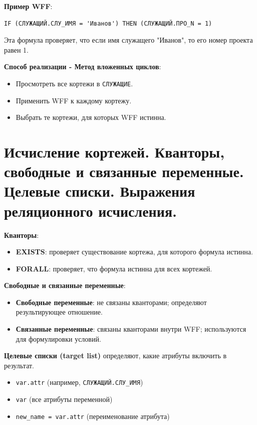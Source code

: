 \documentclass[a4paper,12pt]{article}
\begin{document}
\textbf{Пример WFF}:

\begin{verbatim}
IF (СЛУЖАЩИЙ.СЛУ_ИМЯ = 'Иванов') THEN (СЛУЖАЩИЙ.ПРО_N = 1)
\end{verbatim}

Эта формула проверяет, что если имя служащего "Иванов", то его номер проекта равен 1.

\textbf{Способ реализации - Метод вложенных циклов}:

\begin{itemize}
    \item Просмотреть все кортежи в \texttt{СЛУЖАЩИЕ}.
    \item Применить WFF к каждому кортежу.
    \item Выбрать те кортежи, для которых WFF истинна.
\end{itemize}

\section{Исчисление кортежей. Кванторы, свободные и связанные переменные. Целевые списки. Выражения реляционного исчисления.}

\textbf{Кванторы}:

\begin{itemize}
    \item \textbf{EXISTS}: проверяет существование кортежа, для которого формула истинна.
    \item \textbf{FORALL}: проверяет, что формула истинна для всех кортежей.
\end{itemize}

\textbf{Свободные и связанные переменные}:

\begin{itemize}
    \item \textbf{Свободные переменные}: не связаны кванторами; определяют результирующее отношение.
    \item \textbf{Связанные переменные}: связаны кванторами внутри WFF; используются для формулировки условий.
\end{itemize}

\textbf{Целевые списки (target list)} определяют, какие атрибуты включить в результат.

\begin{itemize}
    \item \texttt{var.attr} (например, \texttt{СЛУЖАЩИЙ.СЛУ\_ИМЯ})
    \item \texttt{var} (все атрибуты переменной)
    \item \texttt{new\_name = var.attr} (переименование атрибута)
\end{itemize}
\end{document}
